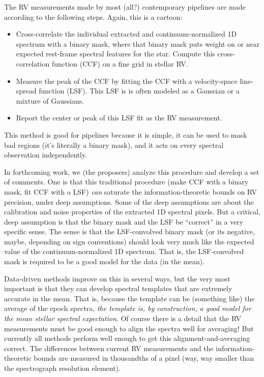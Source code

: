 \documentclass[12pt]{article}
\begin{document}
The RV measurements made by most (all?) contemporary pipelines \cite[eg,]{harps} are made according to the following steps. Again, this is a cartoon:
\begin{itemize}
    \item Cross-correlate the individual extracted and continuum-normalized 1D spectrum with a binary mask, where that binary mask puts weight on or near expected rest-frame spectral features for the star. Compute this cross-correlation function (CCF) on a fine grid in stellar RV.
    \item Measure the peak of the CCF by fitting the CCF with a velocity-space line-spread function (LSF). This LSF is is often modeled as a Gaussian or a mixture of Gaussians.
    \item Report the center or peak of this LSF fit as the RV measurement.
\end{itemize}
This method is good for pipelines because it is simple, it can be used to mask bad regions (it's literally a binary mask), and it acts on every spectral observation independently.

In forthcoming work, we (the proposers) analyze this procedure and develop a set of comments.
One is that this traditional procedure (make CCF with a binary mask, fit CCF with a LSF) \emph{can} saturate the information-theoretic bounds on RV precision, under deep assumptions.
Some of the deep assumptions are about the calibration and noise properties of the extracted 1D spectral pixels.
But a critical, deep assumption is that the binary mask and the LSF be ``correct'' in a very specific sense.
The sense is that the LSF-convolved binary mask (or its negative, maybe, depending on sign conventions) should look very much like the expected value of the continuum-normalized 1D spectrum.
That is, the LSF-convolved mask is required to be a good model for the data (in the mean).

Data-driven methods improve on this in several ways, but the very most important is that they can develop spectral templates that are extremely accurate in the mean.
That is, because the template can be (something like) the average of the epoch spectra, \emph{the template is, by construction, a good model for the mean stellar spectral expectation}.
Of course there is a detail that the RV measurements must be good enough to align the spectra well for averaging!
But currently all methods perform well enough to get this alignment-and-averaging correct.
The differences between current RV measurements and the information-theoretic bounds are measured in thousandths of a pixel (way, way smaller than the spectrograph resolution element).
\end{document}
